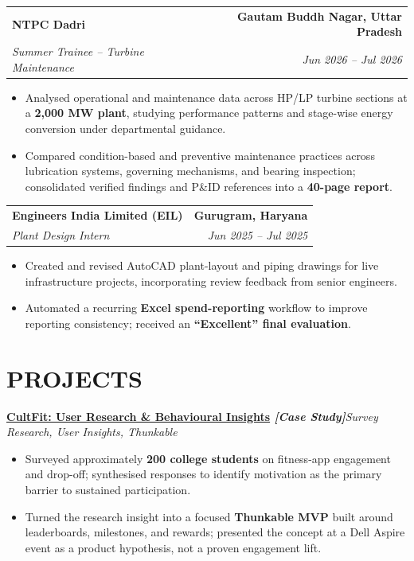 \documentclass[10pt,a4paper]{article}
\makeatletter
\newcommand{\resumeSubheading}[4]{%
  \begin{tabular*}{\textwidth}{@{}l@{\extracolsep{\fill}}r@{}}
    \textbf{#1} & \textbf{#2} \\
    \textit{#3} & \textit{#4}
  \end{tabular*}\vspace{-3pt}
}
\newcommand{\resumeProject}[2]{%
  \textbf{#1}\hfill{\small\textit{#2}}\vspace{-3pt}
}
\makeatother
\begin{document}
\resumeSubheading
  {NTPC Dadri}{Gautam Buddh Nagar, Uttar Pradesh}
  {Summer Trainee -- Turbine Maintenance}{Jun 2026 -- Jul 2026}

\begin{itemize}
  \item Analysed operational and maintenance data across HP/LP turbine sections
  at a \textbf{2,000 MW plant}, studying performance patterns and stage-wise
  energy conversion under departmental guidance.

  \item Compared condition-based and preventive maintenance practices across
  lubrication systems, governing mechanisms, and bearing inspection; consolidated
  verified findings and P\&ID references into a \textbf{40-page report}.
\end{itemize}

\resumeSubheading
  {Engineers India Limited (EIL)}{Gurugram, Haryana}
  {Plant Design Intern}{Jun 2025 -- Jul 2025}

\begin{itemize}
  \item Created and revised AutoCAD plant-layout and piping drawings for live
  infrastructure projects, incorporating review feedback from senior engineers.

  \item Automated a recurring \textbf{Excel spend-reporting} workflow to improve
  reporting consistency; received an \textbf{``Excellent'' final evaluation}.
\end{itemize}


\section*{PROJECTS}

\resumeProject
  {\href{https://nothing0g.github.io/analyst/projects/cultfit-user-behavior/}
  {CultFit: User Research \& Behavioural Insights}
  \hspace{3pt}\textnormal{{\color{githubblue}\textit{[Case Study]}}}}
  {Survey Research, User Insights, Thunkable}

\begin{itemize}
  \item Surveyed approximately \textbf{200 college students} on fitness-app
  engagement and drop-off; synthesised responses to identify motivation as
  the primary barrier to sustained participation.

  \item Turned the research insight into a focused \textbf{Thunkable MVP}
  built around leaderboards, milestones, and rewards; presented the concept
  at a Dell Aspire event as a product hypothesis, not a proven engagement lift.
\end{itemize}
\end{document}
